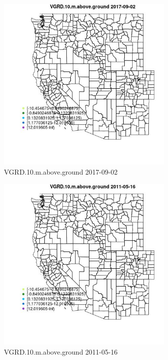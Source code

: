 \begin{figure} 
\centering  
\includegraphics[width=0.77\textwidth]{Code_Outputs/Report_ML_input_PM25_Step4_part_e_de_duplicated_aveswNAs_MapObsVGRD10maboveground2017-09-02.jpg} 
\caption{\label{fig:Report_ML_input_PM25_Step4_part_e_de_duplicated_aveswNAsMapObsVGRD10maboveground2017-09-02}VGRD.10.m.above.ground 2017-09-02} 
\end{figure} 
 

\clearpage 

\begin{figure} 
\centering  
\includegraphics[width=0.77\textwidth]{Code_Outputs/Report_ML_input_PM25_Step4_part_e_de_duplicated_aveswNAs_MapObsVGRD10maboveground2011-05-16.jpg} 
\caption{\label{fig:Report_ML_input_PM25_Step4_part_e_de_duplicated_aveswNAsMapObsVGRD10maboveground2011-05-16}VGRD.10.m.above.ground 2011-05-16} 
\end{figure} 
 

